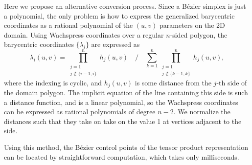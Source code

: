 \documentclass{article}
\begin{document}
Here we propose an alternative conversion process. Since a B\'ezier simplex is just a polynomial,
the only problem is how to express the generalized barycentric coordinates as a rational polynomial
of the $(u,v)$ parameters on the 2D domain. Using Wachspress coordinates over a regular $n$-sided
polygon, the barycentric coordinates $\{\lambda_i\}$ are expressed as
\begin{equation}
  \label{eq:wachspress}
  \lambda_i(u,v) = \prod_{\substack{j=1\\j\notin\{i-1,i\}}}^nh_j(u,v) \quad\bigg/\quad
                   \sum_{k=1}^n\prod_{\substack{j=1\\j\notin\{k-1,k\}}}^nh_j(u,v),
\end{equation}
where the indexing is cyclic, and $h_j(u,v)$ is some distance
from the $j$-th side of the domain polygon. The implicit
equation of the line containing this side is such a distance function, and is a linear polynomial,
so the Wachspress coordinates can be expressed as rational polynomials of degree $n-2$. We
normalize the distances such that they take on take on the value 1 at vertices adjacent to the side.

Using this method, the B\'ezier control points of the tensor product representation
can be located by straightforward computation, which takes only milliseconds.
\end{document}
